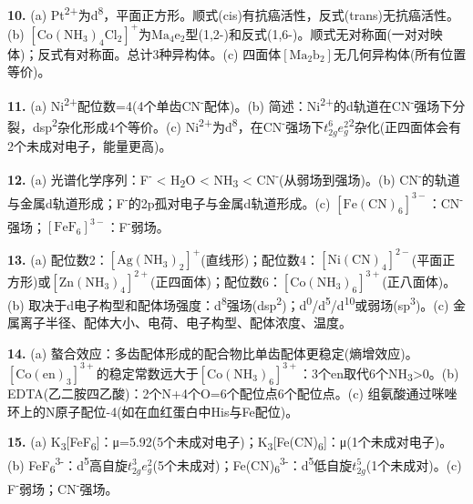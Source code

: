 \textbf{10.} (a) Pt\textsuperscript{2+}为d\textsuperscript{8}，平面正方形。顺式(cis)有抗癌活性，反式(trans)无抗癌活性。(b) \(\mathrm{[Co(NH_3)_4Cl_2]^+}\)为\(\mathrm{Ma_4e_2}\)型(1,2-)和反式(1,6-)。顺式无对称面(一对对映体)；反式有对称面。总计3种异构体。(c) 四面体\(\mathrm{[Ma_2b_2]}\)无几何异构体(所有位置等价)。

\textbf{11.} (a) Ni\textsuperscript{2+}配位数=4(4个单齿CN\textsuperscript{-}配体)。(b) 简述：Ni\textsuperscript{2+}的d轨道在CN\textsuperscript{-}强场下分裂，dsp\textsuperscript{2}杂化形成4个等价。(c) Ni\textsuperscript{2+}为d\textsuperscript{8}，在CN\textsuperscript{-}强场下\(t_{2g}^6 e_g^2\)\textsuperscript{2}杂化(正四面体会有2个未成对电子，能量更高)。

\textbf{12.} (a) 光谱化学序列：F\textsuperscript{-} \textless{} H\textsubscript{2}O \textless{} NH\textsubscript{3} \textless{} CN\textsuperscript{-}(从弱场到强场)。(b) CN\textsuperscript{-}的\派*轨道与金属d轨道形成；F\textsuperscript{-}的2p孤对电子与金属d轨道形成。(c) \(\mathrm{[Fe(CN)_6]^{3-}}\)：CN\textsuperscript{-}强场；\(\mathrm{[FeF_6]^{3-}}\)：F\textsuperscript{-}弱场。

\textbf{13.} (a) 配位数2：\(\mathrm{[Ag(NH_3)_2]^+}\)(直线形)；配位数4：\(\mathrm{[Ni(CN)_4]^{2-}}\)(平面正方形)或\(\mathrm{[Zn(NH_3)_4]^{2+}}\)(正四面体)；配位数6：\(\mathrm{[Co(NH_3)_6]^{3+}}\)(正八面体)。(b) 取决于d电子构型和配体场强度：d\textsuperscript{8}强场(dsp\textsuperscript{2})；d\textsuperscript{0}/d\textsuperscript{5}/d\textsuperscript{10}或弱场(sp\textsuperscript{3})。(c) 金属离子半径、配体大小、电荷、电子构型、配体浓度、温度。

\textbf{14.} (a) 螯合效应：多齿配体形成的配合物比单齿配体更稳定(熵增效应)。\(\mathrm{[Co(en)_3]^{3+}}\)的稳定常数远大于\(\mathrm{[Co(NH_3)_6]^{3+}}\)：3个en取代6个NH\textsubscript{3}\textgreater0。(b) EDTA(乙二胺四乙酸)：2个N+4个O=6个配位点6个配位点。(c) 组氨酸通过咪唑环上的N原子配位-4(如在血红蛋白中His与Fe配位)。

\textbf{15.} (a) K\textsubscript{3}{[}FeF\textsubscript{6}{]}：μ=5.92(5个未成对电子)；K\textsubscript{3}{[}Fe(CN)\textsubscript{6}{]}：μ(1个未成对电子)。(b) FeF\textsubscript{6}\textsuperscript{3-}：d\textsuperscript{5}高自旋\(t_{2g}^3 e_g^2\)(5个未成对)；Fe(CN)\textsubscript{6}\textsuperscript{3-}：d\textsuperscript{5}低自旋\(t_{2g}^5\)(1个未成对)。(c) F\textsuperscript{-}弱场；CN\textsuperscript{-}强场。

